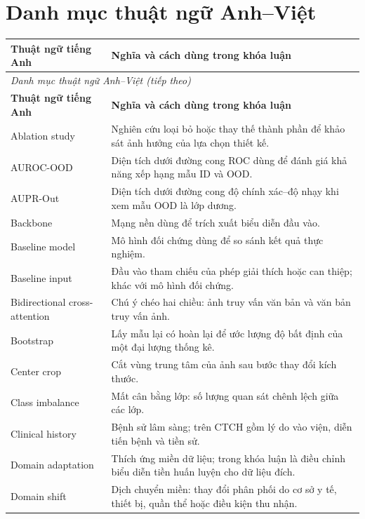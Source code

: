 \chapter*{Danh mục thuật ngữ Anh--Việt}
\begingroup
\small
{}
\setlength{\tabcolsep}{5pt}
\renewcommand{\arraystretch}{1.15}
\begin{longtable}{@{}p{}p{}@{}}
\toprule
\textbf{Thuật ngữ tiếng Anh} & \textbf{Nghĩa và cách dùng trong khóa luận} \\
\midrule
\endfirsthead
\multicolumn{2}{l}{\textit{Danh mục thuật ngữ Anh--Việt (tiếp theo)}}\\
\toprule
\textbf{Thuật ngữ tiếng Anh} & \textbf{Nghĩa và cách dùng trong khóa luận} \\
\midrule
\endhead
\bottomrule
\endlastfoot
Ablation study & Nghiên cứu loại bỏ hoặc thay thế thành phần để khảo sát ảnh hưởng của lựa chọn thiết kế. \\
AUROC-OOD & Diện tích dưới đường cong ROC dùng để đánh giá khả năng xếp hạng mẫu ID và OOD. \\
AUPR-Out & Diện tích dưới đường cong độ chính xác--độ nhạy khi xem mẫu OOD là lớp dương. \\
Backbone & Mạng nền dùng để trích xuất biểu diễn đầu vào. \\
Baseline model & Mô hình đối chứng dùng để so sánh kết quả thực nghiệm. \\
Baseline input & Đầu vào tham chiếu của phép giải thích hoặc can thiệp; khác với mô hình đối chứng. \\
Bidirectional cross-attention & Chú ý chéo hai chiều: ảnh truy vấn văn bản và văn bản truy vấn ảnh. \\
Bootstrap & Lấy mẫu lại có hoàn lại để ước lượng độ bất định của một đại lượng thống kê. \\
Center crop & Cắt vùng trung tâm của ảnh sau bước thay đổi kích thước. \\
Class imbalance & Mất cân bằng lớp: số lượng quan sát chênh lệch giữa các lớp. \\
Clinical history & Bệnh sử lâm sàng; trên CTCH gồm lý do vào viện, diễn tiến bệnh và tiền sử. \\
Domain adaptation & Thích ứng miền dữ liệu; trong khóa luận là điều chỉnh biểu diễn tiền huấn luyện cho dữ liệu đích. \\
Domain shift & Dịch chuyển miền: thay đổi phân phối do cơ sở y tế, thiết bị, quần thể hoặc điều kiện thu nhận. \\

\end{longtable}
